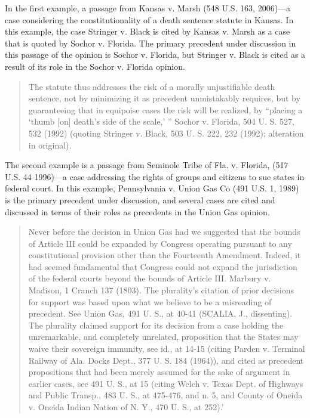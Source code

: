 \documentclass[headsepline=true, abstracton]{scrartcl}
\begin{document}
In the first example, a passage from Kansas v. Marsh (548 U.S. 163, 2006)---a case considering the constitutionality of a death sentence statute in Kansas. In this example, the case Stringer v. Black is cited by Kansas v. Marsh as a case that is quoted by Sochor v. Florida. The primary precedent under discussion in this passage of the opinion is Sochor v. Florida, but Stringer v. Black is cited as a result of its role in the Sochor v. Florida opinion.
\begin{quotation}
The statute thus addresses the risk of a morally unjustifiable death sentence, not by minimizing it as precedent unmistakably requires, but by guaranteeing that in equipoise cases the risk will be realized, by ``placing a `thumb [on] death's side of the scale,' '' Sochor v. Florida, 504 U. S. 527, 532 (1992) (quoting Stringer v. Black, 503 U. S. 222, 232 (1992); alteration in original).
\end{quotation} %
The second example is a passage from Seminole Tribe of Fla. v. Florida, 
(517 U.S. 44 1996)---a case addressing the rights of groups and citizens to sue states in federal court. In this example, Pennsylvania v. Union Gas Co
(491 U.S. 1, 1989) is the primary precedent under discussion, and several cases are cited and discussed in terms of their roles as precedents in the Union Gas opinion. 
\begin{quotation}
Never before the decision in Union Gas had we suggested that the bounds of Article III could be expanded by Congress operating pursuant to any constitutional provision other than the Fourteenth Amendment. Indeed, it had seemed fundamental that Congress could not expand the jurisdiction of the federal courts beyond the bounds of Article III. Marbury v. Madison, 1 Cranch 137 (1803). The plurality's citation of prior decisions for support was based upon what we believe to be a misreading of precedent. See Union Gas, 491 U. S., at 40-41 (SCALIA, J., dissenting). The plurality claimed support for its decision from a case holding the unremarkable, and completely unrelated, proposition that the States may waive their sovereign immunity, see id., at 14-15 (citing Parden v. Terminal Railway of Ala. Docks Dept., 377 U. S. 184 (1964)), and cited as precedent propositions that had been merely assumed for the sake of argument in earlier cases, see 491 U. S., at 15 (citing Welch v. Texas Dept. of Highways and Public Transp., 483 U. S., at 475-476, and n. 5, and County of Oneida v. Oneida Indian Nation of N. Y., 470 U. S., at 252).'
\end{quotation}%
\end{document}

